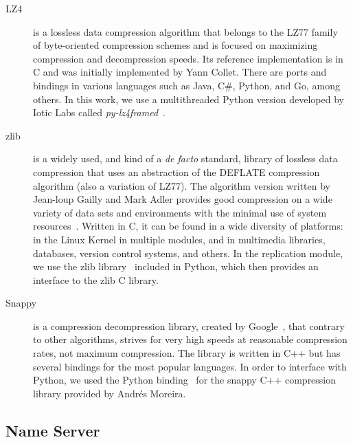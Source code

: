 \begin{description}
	\item [LZ4] is a lossless data compression algorithm that belongs to the LZ77 family~\cite{lz77} of byte-oriented compression schemes and is focused on maximizing compression and decompression speeds. Its reference implementation is in C and was initially implemented by Yann Collet. There are ports and bindings in various languages such as Java, C\#, Python, and Go, among others. In this work, we use a multithreaded Python version developed by Iotic Labs called \textit{py-lz4framed}~\cite{lz4framed}.
	\item [zlib] is a widely used, and kind of a \textit{de facto} standard, library of lossless data compression that uses an abstraction of the DEFLATE compression algorithm (also a variation of LZ77). The algorithm version written by Jean-loup Gailly and Mark Adler provides good compression on a wide variety of data sets and environments with the minimal use of system resources~\cite{zlib}. Written in C, it can be found in a wide diversity of platforms: in the Linux Kernel in multiple modules, and in multimedia libraries, databases, version control systems, and others. In the replication module, we use the zlib library~\cite{py_zlib} included in Python, which then provides an interface to the zlib C library.
	\item [Snappy] is a compression \/ decompression library, created by Google~\cite{snappy}, that contrary to other algorithms, strives for very high speeds at reasonable compression rates, not maximum compression. The library is written in C++ but has several bindings for the most popular languages. In order to interface with Python, we used the Python binding~\cite{py_snappy} for the snappy C++ compression library provided by Andrés Moreira.
\end{description}

\subsection{Name Server}
\label{sub:impl_icbdrep_name_server}


